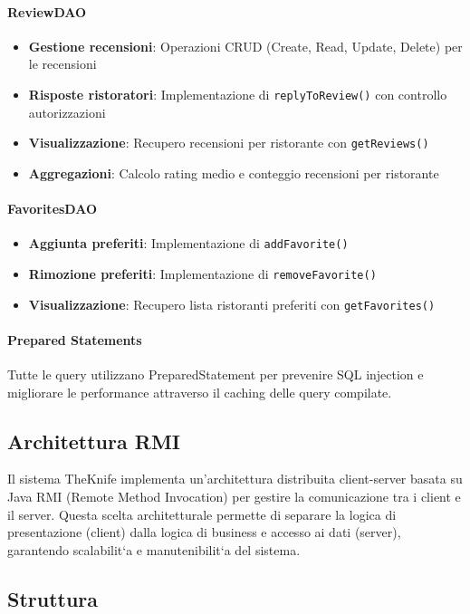 \paragraph{ReviewDAO}
\begin{itemize}
    \item \textbf{Gestione recensioni}: Operazioni CRUD (Create, Read, Update, Delete) per le recensioni
    \item \textbf{Risposte ristoratori}: Implementazione di \texttt{replyToReview()} con controllo autorizzazioni
    \item \textbf{Visualizzazione}: Recupero recensioni per ristorante con \texttt{getReviews()}
    \item \textbf{Aggregazioni}: Calcolo rating medio e conteggio recensioni per ristorante
\end{itemize}

\paragraph{FavoritesDAO}
\begin{itemize}
    \item \textbf{Aggiunta preferiti}: Implementazione di \texttt{addFavorite()}
    \item \textbf{Rimozione preferiti}: Implementazione di \texttt{removeFavorite()}
    \item \textbf{Visualizzazione}: Recupero lista ristoranti preferiti con \texttt{getFavorites()}
\end{itemize}

\paragraph{Prepared Statements}
Tutte le query utilizzano PreparedStatement per prevenire SQL injection e migliorare le performance attraverso il caching delle query compilate.

\subsection{Architettura RMI}
\label{sec:rmi}
Il sistema TheKnife implementa un'architettura distribuita client-server basata su Java
RMI (Remote Method Invocation) per gestire la comunicazione tra i client e il server.
Questa scelta architetturale permette di separare la logica di presentazione (client) dalla
logica di business e accesso ai dati (server), garantendo scalabilit`a e manutenibilit`a del
sistema.
\subsection{Struttura}

